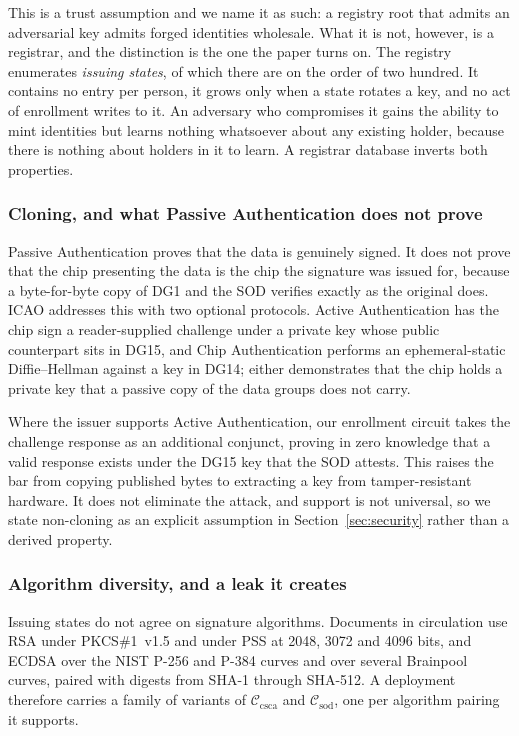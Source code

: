 \documentclass[11pt,a4paper]{article}
\theoremstyle{definition}
\theoremstyle{plain}
\theoremstyle{remark}
\begin{document}
This is a trust assumption and we name it as such: a registry root that admits an adversarial key admits forged identities wholesale. What it is not, however, is a registrar, and the distinction is the one the paper turns on. The registry enumerates \emph{issuing states}, of which there are on the order of two hundred. It contains no entry per person, it grows only when a state rotates a key, and no act of enrollment writes to it. An adversary who compromises it gains the ability to mint identities but learns nothing whatsoever about any existing holder, because there is nothing about holders in it to learn. A registrar database inverts both properties.

\subsubsection{Cloning, and what Passive Authentication does not prove}
\label{sec:cloning}

Passive Authentication proves that the data is genuinely signed. It does not prove that the chip presenting the data is the chip the signature was issued for, because a byte-for-byte copy of DG1 and the SOD verifies exactly as the original does. ICAO addresses this with two optional protocols. Active Authentication has the chip sign a reader-supplied challenge under a private key whose public counterpart sits in DG15, and Chip Authentication performs an ephemeral-static Diffie--Hellman against a key in DG14; either demonstrates that the chip holds a private key that a passive copy of the data groups does not carry.

Where the issuer supports Active Authentication, our enrollment circuit takes the challenge response as an additional conjunct, proving in zero knowledge that a valid response exists under the DG15 key that the SOD attests. This raises the bar from copying published bytes to extracting a key from tamper-resistant hardware. It does not eliminate the attack, and support is not universal, so we state non-cloning as an explicit assumption in Section~\ref{sec:security} rather than a derived property.

\subsubsection{Algorithm diversity, and a leak it creates}
\label{sec:variant}

Issuing states do not agree on signature algorithms. Documents in circulation use RSA under PKCS\#1~v1.5 and under PSS at 2048, 3072 and 4096 bits, and ECDSA over the NIST P-256 and P-384 curves and over several Brainpool curves, paired with digests from SHA-1 through SHA-512. A deployment therefore carries a family of variants of $\mathcal{C}_{\mathrm{csca}}$ and $\mathcal{C}_{\mathrm{sod}}$, one per algorithm pairing it supports.
\end{document}
